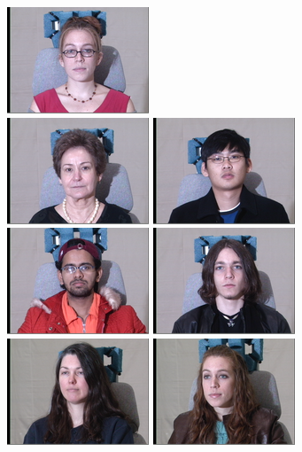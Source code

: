 \begin{figure}
\includegraphics[scale=0.4,clip=true]{figures_cvpr/223_01_01_051_08.png} \\
\includegraphics[scale=0.4,clip=true]{figures_cvpr/079_02_01_051_08.png} 
\includegraphics[scale=0.4,clip=true]{figures_cvpr/130_02_01_051_08.png} 
\includegraphics[scale=0.4,clip=true]{figures_cvpr/163_02_01_051_08.png} 
\includegraphics[scale=0.4,clip=true]{figures_cvpr/175_02_01_051_08.png} 
\includegraphics[scale=0.4,clip=true]{figures_cvpr/118_02_01_140_08.png} 
\includegraphics[scale=0.4,clip=true]{figures_cvpr/223_02_01_140_08.png} 

\end{figure}
